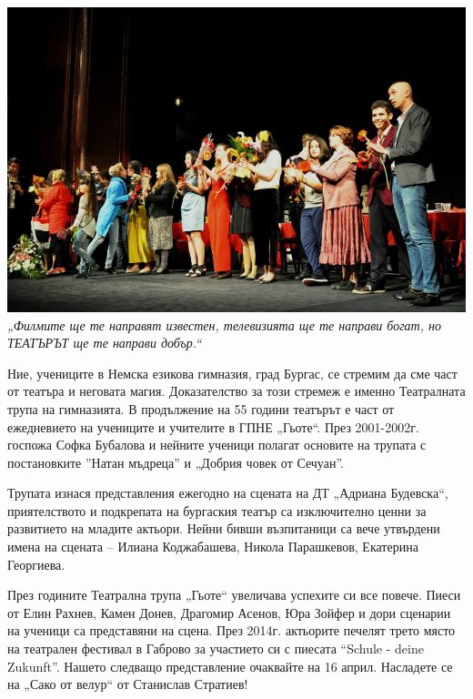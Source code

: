 
\begin{center}
\includegraphics[width=6.2in]{./Teatar/1.jpg}\\
\textit{„Филмите ще те направят известен, телевизията ще те направи богат, но ТЕАТЪРЪТ ще те направи добър.``}
\end{center}

Ние, учениците в Немска езикова гимназия, град Бургас, се стремим да сме част от театъра и неговата магия. Доказателство за този стремеж е именно Театралната трупа на гимназията. В продължение на 55 години театърът е част от ежедневието на учениците и учителите в ГПНЕ „Гьоте“. През 2001-2002г. госпожа Софка Бубалова и нейните ученици полагат основите на трупата с постановките ”Натан мъдреца” и „Добрия човек от Сечуан”. 

Трупата изнася представления ежегодно на сцената на ДТ „Адриана Будевска“, приятелството и подкрепата на бургаския театър са изключително ценни за развитието на младите актьори. Нейни бивши възпитаници са  вече утвърдени имена на сцената – Илиана Коджабашева, Никола Парашкевов, Екатерина Георгиева.

През годините Театрална трупа „Гьоте“ увеличава успехите си все повече. Пиеси от Елин Рахнев,  Камен Донев, Драгомир Асенов, Юра Зойфер и дори сценарии на ученици са представяни на сцена. През 2014г. актьорите печелят трето място на театрален фестивал в Габрово за участието си с пиесата “Schule - deine Zukunft”. Нашето следващо представление очаквайте на 16 април. Насладете се на „Сако от велур“ от Станислав Стратиев!

